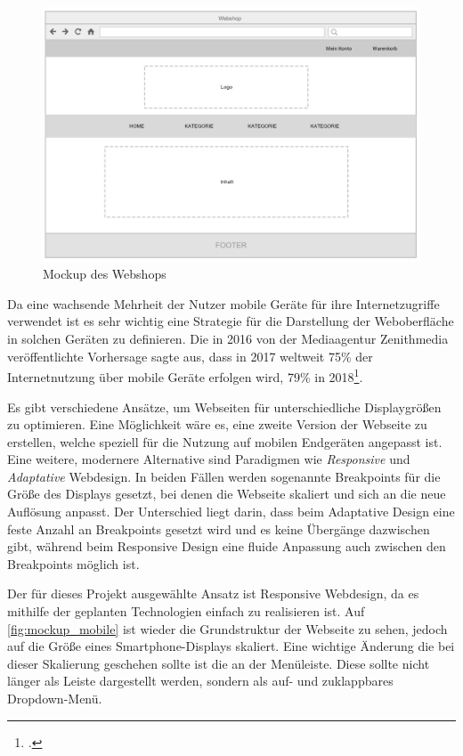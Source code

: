 \begin{figure}[ht!]
	\centering
	\includegraphics[width=\linewidth]{bilder/kap6/mockup_shop.png}
	\caption{Mockup des Webshops}
	\label{fig:mockup_shop}
\end{figure}

Da eine wachsende Mehrheit der Nutzer mobile Geräte für ihre Internetzugriffe verwendet ist es sehr wichtig eine Strategie für die Darstellung der Weboberfläche in solchen Geräten zu definieren. Die in 2016 von der Mediaagentur Zenithmedia veröffentlichte Vorhersage sagte aus, dass in 2017 weltweit 75\% der Internetnutzung über mobile Geräte erfolgen wird, 79\% in 2018\footcite[Vgl.][]{Zenithmedia2016}.

Es gibt verschiedene Ansätze, um Webseiten für unterschiedliche Displaygrößen zu optimieren. Eine Möglichkeit wäre es, eine zweite Version der Webseite zu erstellen, welche speziell für die Nutzung auf mobilen Endgeräten angepasst ist. Eine weitere, modernere Alternative sind Paradigmen wie \textit{Responsive} und \textit{Adaptative} Webdesign. In beiden Fällen werden sogenannte Breakpoints für die Größe des Displays gesetzt, bei denen die Webseite skaliert und sich an die neue Auflösung anpasst. Der Unterschied liegt darin, dass beim Adaptative Design eine feste Anzahl an Breakpoints gesetzt wird und es keine Übergänge dazwischen gibt, während beim Responsive Design eine fluide Anpassung auch zwischen den Breakpoints möglich ist.

Der für dieses Projekt ausgewählte Ansatz ist Responsive Webdesign, da es mithilfe der geplanten Technologien einfach zu realisieren ist. Auf \cref{fig:mockup_mobile} ist wieder die Grundstruktur der Webseite zu sehen, jedoch auf die Größe eines Smartphone-Displays skaliert. Eine wichtige Änderung die bei dieser Skalierung geschehen sollte ist die an der Menüleiste. Diese sollte nicht länger als Leiste dargestellt werden, sondern als auf- und zuklappbares Dropdown-Menü. 

